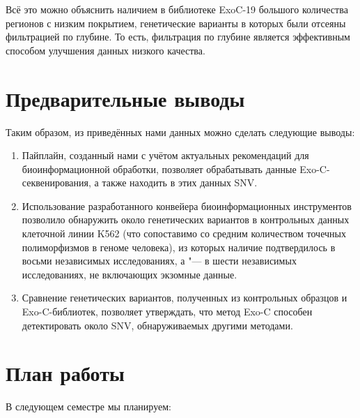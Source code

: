 \documentclass[a4paper,14pt]{extarticle}
\newcommand{\thousands}{тыс.}
\newcommand{\mln}{млн}
\begin{document}
Всё это можно объяснить наличием в библиотеке ExoC-19 большого количества регионов с низким покрытием, генетические варианты в которых были отсеяны фильтрацией по глубине.
То есть, фильтрация по глубине является эффективным способом улучшения данных низкого качества.

\section*{Предварительные выводы}

Таким образом, из приведённых нами данных можно сделать следующие выводы:

\begin{enumerate}
	\item Пайплайн, созданный нами с учётом актуальных рекомендаций для биоинформационной обработки, позволяет обрабатывать данные Exo-C\hyp{}секвенирования, а также находить в этих данных SNV.
	\item Использование разработанного конвейера биоинформационных инструментов позволило обнаружить около \numprint[\mln]{5.5} генетических вариантов в контрольных данных клеточной линии K562 (что сопоставимо со средним количеством точечных полиморфизмов в геноме человека), из которых наличие \numprint[\thousands]{75} подтвердилось в восьми независимых исследованиях, а \numprint[\mln]{1} "--- в шести независимых исследованиях, не включающих экзомные данные.
	\item Сравнение генетических вариантов, полученных из контрольных образцов и Exo-C\hyp{}библиотек, позволяет утверждать, что метод Exo-C способен детектировать около  SNV, обнаруживаемых другими методами.
\end{enumerate}

\section*{План работы}

В следующем семестре мы планируем:
\end{document}
